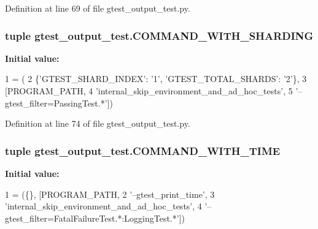 Definition at line 69 of file gtest\+\_\+output\+\_\+test.\+py.

\subsubsection[{\texorpdfstring{C\+O\+M\+M\+A\+N\+D\+\_\+\+W\+I\+T\+H\+\_\+\+S\+H\+A\+R\+D\+I\+NG}{COMMAND_WITH_SHARDING}}]{\setlength{\rightskip}{0pt plus 5cm}tuple gtest\+\_\+output\+\_\+test.\+C\+O\+M\+M\+A\+N\+D\+\_\+\+W\+I\+T\+H\+\_\+\+S\+H\+A\+R\+D\+I\+NG}\hypertarget{namespacegtest__output__test_a462eef2a00782001d491b7a38a847bec}{}\label{namespacegtest__output__test_a462eef2a00782001d491b7a38a847bec}
{\bfseries Initial value\+:}
\begin{DoxyCode}
1 = (
2     \{\textcolor{stringliteral}{'GTEST\_SHARD\_INDEX'}: \textcolor{stringliteral}{'1'}, \textcolor{stringliteral}{'GTEST\_TOTAL\_SHARDS'}: \textcolor{stringliteral}{'2'}\},
3     [PROGRAM\_PATH,
4      \textcolor{stringliteral}{'internal\_skip\_environment\_and\_ad\_hoc\_tests'},
5      \textcolor{stringliteral}{'--gtest\_filter=PassingTest.*'}])
\end{DoxyCode}


Definition at line 74 of file gtest\+\_\+output\+\_\+test.\+py.

\subsubsection[{\texorpdfstring{C\+O\+M\+M\+A\+N\+D\+\_\+\+W\+I\+T\+H\+\_\+\+T\+I\+ME}{COMMAND_WITH_TIME}}]{\setlength{\rightskip}{0pt plus 5cm}tuple gtest\+\_\+output\+\_\+test.\+C\+O\+M\+M\+A\+N\+D\+\_\+\+W\+I\+T\+H\+\_\+\+T\+I\+ME}\hypertarget{namespacegtest__output__test_a1c27d93a57990d21461436f2d5ff3064}{}\label{namespacegtest__output__test_a1c27d93a57990d21461436f2d5ff3064}
{\bfseries Initial value\+:}
\begin{DoxyCode}
1 = (\{\}, [PROGRAM\_PATH,
2                           \textcolor{stringliteral}{'--gtest\_print\_time'},
3                           \textcolor{stringliteral}{'internal\_skip\_environment\_and\_ad\_hoc\_tests'},
4                           \textcolor{stringliteral}{'--gtest\_filter=FatalFailureTest.*:LoggingTest.*'}])
\end{DoxyCode}


